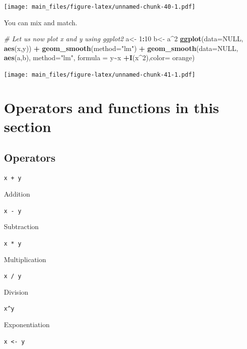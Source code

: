 \documentclass[
]{book}
\newenvironment{Shaded}{\begin{snugshade}}{\end{snugshade}}
\newcommand{\AttributeTok}[1]{\textcolor[rgb]{0.13,0.29,0.53}{#1}}
\newcommand{\CommentTok}[1]{\textcolor[rgb]{0.56,0.35,0.01}{\textit{#1}}}
\newcommand{\ConstantTok}[1]{\textcolor[rgb]{0.56,0.35,0.01}{#1}}
\newcommand{\DecValTok}[1]{\textcolor[rgb]{0.00,0.00,0.81}{#1}}
\newcommand{\FunctionTok}[1]{\textcolor[rgb]{0.13,0.29,0.53}{\textbf{#1}}}
\newcommand{\NormalTok}[1]{#1}
\newcommand{\OtherTok}[1]{\textcolor[rgb]{0.56,0.35,0.01}{#1}}
\newcommand{\SpecialCharTok}[1]{\textcolor[rgb]{0.81,0.36,0.00}{\textbf{#1}}}
\newcommand{\StringTok}[1]{\textcolor[rgb]{0.31,0.60,0.02}{#1}}
\begin{document}
\texttt{[image: main\_files/figure-latex/unnamed-chunk-40-1.pdf]}

You can mix and match.

\begin{Shaded}
\begin{Highlighting}[]
\CommentTok{\# Let us now plot x and y using ggplot2}
\NormalTok{a}\OtherTok{\textless{}{-}} \DecValTok{1}\SpecialCharTok{:}\DecValTok{10}
\NormalTok{b}\OtherTok{\textless{}{-}}\NormalTok{ a}\SpecialCharTok{\^{}}\DecValTok{2}
\FunctionTok{ggplot}\NormalTok{(}\AttributeTok{data=}\ConstantTok{NULL}\NormalTok{, }\FunctionTok{aes}\NormalTok{(x,y)) }\SpecialCharTok{+}
  \FunctionTok{geom\_smooth}\NormalTok{(}\AttributeTok{method=}\StringTok{"lm"}\NormalTok{) }\SpecialCharTok{+}
  \FunctionTok{geom\_smooth}\NormalTok{(}\AttributeTok{data=}\ConstantTok{NULL}\NormalTok{, }\FunctionTok{aes}\NormalTok{(a,b), }\AttributeTok{method=}\StringTok{"lm"}\NormalTok{, }\AttributeTok{formula =}\NormalTok{ y}\SpecialCharTok{\textasciitilde{}}\NormalTok{x }\SpecialCharTok{+}\FunctionTok{I}\NormalTok{(x}\SpecialCharTok{\^{}}\DecValTok{2}\NormalTok{),}\AttributeTok{color=} \StringTok{\textquotesingle{}orange\textquotesingle{}}\NormalTok{) }
\end{Highlighting}
\end{Shaded}

\texttt{[image: main\_files/figure-latex/unnamed-chunk-41-1.pdf]}

\section{Operators and functions in this section}\label{operators-and-functions-in-this-section}

\subsection{Operators}\label{operators-1}

\texttt{x\ +\ y}

Addition

\texttt{x\ -\ y}

Subtraction

\texttt{x\ *\ y}

Multiplication

\texttt{x\ /\ y}

Division

\texttt{x\^{}y}

Exponentiation

\texttt{x\ \textless{}-\ y}
\end{document}
